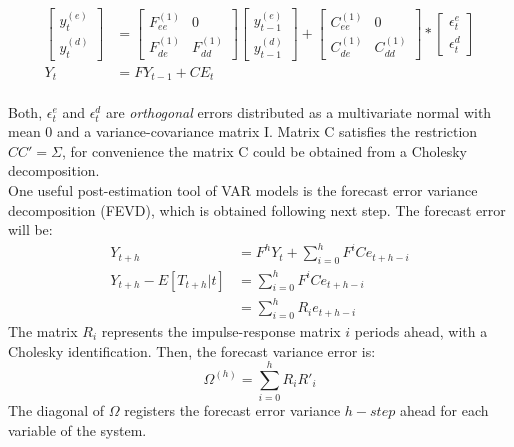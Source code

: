 \documentclass[12pt, a4paper]{article}
\begin{document}
	\begin{equation}
	   \begin{aligned}
	     \left[ \begin{array}{c}  y^{(e)}_t  \\ y^{(d)}_t \end{array} \right]
	    & =
		\left[ \begin{array}{cc}  F_{ee}^{(1)} & 0 \\ F_{de}^{(1)} & F_{dd}^{(1)} \end{array} \right]
		\left[ \begin{array}{c}  y^{(e)}_{t-1}  \\ y^{(d)}_{t-1}  \end{array} \right]
	 	+
    	\left[ \begin{array}{cc}  C_{ee}^{(1)} & 0 \\ C_{de}^{(1)} & C_{dd}^{(1)} \end{array} \right]  *\left[ \begin{array}{c}  \epsilon^e_{t}  \\ \epsilon^d_{t}  \end{array} \right]  \\
	   Y_t & = F Y_{t-1} + C E_t
	\end{aligned}
	\end{equation} \\
Both, $\epsilon^e_{t}$ and $\epsilon^d_{t}$ are \textit{orthogonal} errors distributed as a multivariate normal with mean 0 and a variance-covariance matrix I. Matrix C satisfies the restriction $CC' = \Sigma$, for convenience the matrix C could be obtained from a Cholesky decomposition. \\
One useful post-estimation tool of VAR models is the forecast error variance decomposition (FEVD), which is obtained following next step. The forecast error will be:
\begin{equation*}
\begin{aligned}
	Y_{t+h} & = F^h Y_t + \sum_{i=0}^h F^{i} C e_{t+h-i}\\
	Y_{t+h}  - E[T_{t+h}|t]& = \sum_{i=0}^h F^{i} C e_{t+h-i} \\
	 & = \sum_{i=0}^h R_{i} e_{t+h-i}
\end{aligned}
\end{equation*}
The matrix $R_i$ represents the impulse-response matrix $i$ periods ahead, with a Cholesky identification. Then, the forecast variance error is:
\begin{equation}
	 \Omega^{(h)} = \sum_{i=0}^h R_{i} R'_{i}
\end{equation}
The diagonal of $\Omega$ registers the forecast error variance $h-step$ ahead for each variable of the system.
\end{document}
